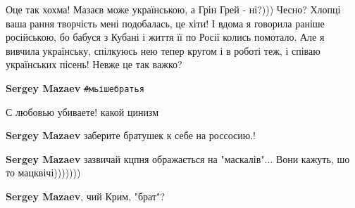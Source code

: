 \begin{itemize}
Оце так хохма! Мазаєв може українською, а Грін Грей - ні?))) Чесно? Хлопці ваша
рання творчість мені подобалась, це хіти! І вдома я говорила раніше
російською, бо бабуся з Кубані і життя її по Росії колись помотало. Але я
вивчила українську, спілкуюсь нею тепер кругом і в роботі теж, і співаю
українських пісень! Невже це так важко?

 
\textbf{Sergey Mazaev} \verb|#мьішебратья|

 
С любовью убиваете! какой цинизм

 
\textbf{Sergey Mazaev} заберите братушек к себе на россосию.!

 
\textbf{Sergey Mazaev} зазвичай кцпня ображається на "маскалів"... Вони кажуть, шо то мацквічі)))))))

 
\textbf{Sergey Mazaev}, чий Крим, "брат"?

\begin{itemize}
 

\end{itemize}
\end{itemize}
